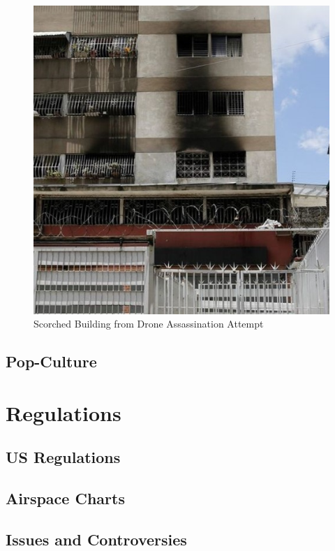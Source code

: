 \documentclass[
]{book}
\theoremstyle{definition}
\theoremstyle{definition}
\theoremstyle{definition}
\theoremstyle{remark}
\begin{document}
\begin{figure}

{\centering \includegraphics[width=0.8\linewidth]{images/history/Venezuela2} 

}

\caption{Scorched Building from Drone Assassination Attempt}\label{fig:venAssassin2}
\end{figure}

\hypertarget{pop-culture}{%
\section{Pop-Culture}\label{pop-culture}}

\hypertarget{regulations}{%
\chapter{Regulations}\label{regulations}}

\hypertarget{us-regulations}{%
\section{US Regulations}\label{us-regulations}}

\hypertarget{airspace-charts}{%
\section{Airspace Charts}\label{airspace-charts}}

\hypertarget{issues-and-controversies}{%
\section{Issues and Controversies}\label{issues-and-controversies}}
\end{document}

